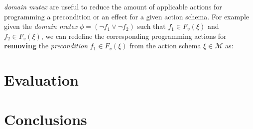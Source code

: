 \documentclass{article}
\begin{document}
{\em domain mutex} are useful to reduce the amount of applicable actions for programming a precondition or an effect for a given action schema. For example given the {\em domain mutex} $\phi=(\neg f_1\vee \neg f_2)$ such that $f_1\in F_v(\xi)$ and $f_2\in F_v(\xi)$, we can redefine the corresponding programming actions for {\bf removing} the {\em precondition} $f_1\in F_v(\xi)$ from the action schema $\xi\in\mathcal{M}$ as:




\section{Evaluation}
\label{sec:evaluation}



\section{Conclusions}
\label{sec:conclusions}




\end{document}

